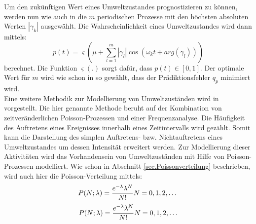 Um den zukünftigen Wert eines Umweltzustandes prognostizieren zu können, werden nun wie auch in \cite{Krajnik.2014} die $m$ periodischen Prozesse mit den höchsten absoluten Werten $|\gamma_k|$ ausgewählt. Die Wahrscheinlichkeit eines Umweltzustandes wird dann mittels:
\begin{equation}
	p(t) = \varsigma(\mu + \sum_{l=1}^{m} |\gamma_l|\cos(\omega_k t + arg(\gamma_l)))
	\label{eq:State_probability}
\end{equation}
berechnet. Die Funktion $\varsigma(.)$ sorgt dafür, dass $p(t) \in [0,1]$. Der optimale Wert für $m$ wird wie schon in \cite{Krajnik.2014} so gewählt, dass der Prädiktionsfehler $q_p$ minimiert wird. \\
Eine weitere Methodik zur Modellierung von Umweltzuständen wird in \cite{Jovan.2016} vorgestellt. Die hier genannte Methode beruht auf der Kombination von zeitveränderlichen Poisson-Prozessen und einer Frequenzanalyse. Die Häufigkeit des Auftretens eines Ereignisses innerhalb eines Zeitintervalls wird gezählt. Somit kann die Darstellung des simplen Auftretens- bzw. Nichtauftretens eines Umweltzustandes \cite{Krajnik.2014} um dessen \glqq Intensität\grqq{} erweitert werden. Zur Modellierung dieser Aktivitäten wird das Vorhandensein von Umweltzuständen mit Hilfe von Poisson-Prozessen modelliert. Wie schon  in Abschnitt \ref{sec.Poissonverteilung} beschrieben, wird auch hier die Poisson-Verteilung mittels:
\begin{equation}
	P(N;\lambda) = \frac{e^{\mathrm{-\lambda}} \lambda^N}{N!}	N=0,1,2,\dots
\end{equation}
\begin{align}
	P(N;\lambda) = \frac{e^{\mathrm{-\lambda}} \lambda^N}{N!}	N=0,1,2,\dots
\end{align}

